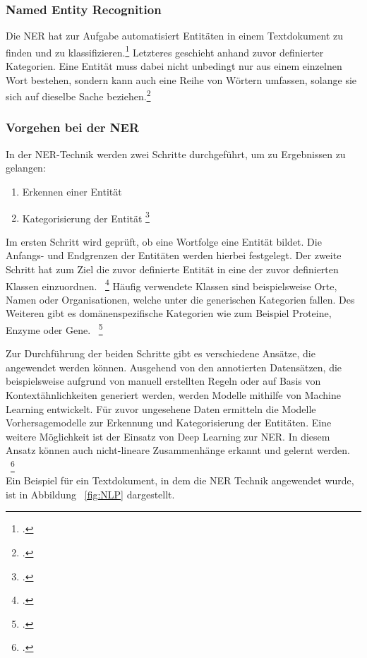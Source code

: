 \subsubsection{Named Entity Recognition}
Die \acl{NER} hat zur Aufgabe automatisiert Entitäten in einem Textdokument zu finden und zu klassifizieren.\footcite[\vglf][]{kulkrni2022} Letzteres geschieht anhand zuvor definierter Kategorien.
Eine Entität muss dabei nicht unbedingt nur aus einem einzelnen Wort bestehen, sondern kann auch eine Reihe von Wörtern umfassen, solange sie sich auf dieselbe Sache beziehen.\footcite[\vglf][]{strobl2022}

\subsubsection{Vorgehen bei der NER}
In der \ac{NER}-Technik werden zwei Schritte durchgeführt, um zu Ergebnissen zu gelangen:

\begin{enumerate}
    \item Erkennen einer Entität
    \item Kategorisierung der Entität \footcite[\vglf][ \& 230]{zong2021}
\end{enumerate}


Im ersten Schritt wird geprüft, ob eine Wortfolge eine Entität bildet. Die Anfangs- und Endgrenzen der Entitäten werden hierbei festgelegt. Der zweite Schritt hat zum Ziel die zuvor definierte Entität in eine der zuvor definierten Klassen einzuordnen. ~\footcite[\vglf][]{bast2016}
Häufig verwendete Klassen sind beispielsweise Orte, Namen oder Organisationen, welche unter die generischen Kategorien fallen. Des Weiteren gibt es domänenspezifische Kategorien wie zum Beispiel Proteine, Enzyme oder Gene. ~\footcite[\vglf][]{li.2018}


Zur Durchführung der beiden Schritte gibt es verschiedene Ansätze, die angewendet werden können. Ausgehend von den annotierten Datensätzen, die beispielsweise aufgrund von manuell erstellten Regeln oder auf Basis von Kontextähnlichkeiten generiert werden, werden Modelle mithilfe von Machine Learning entwickelt.
Für zuvor ungesehene Daten ermitteln die Modelle Vorhersagemodelle zur Erkennung und Kategorisierung der Entitäten. Eine weitere Möglichkeit ist der Einsatz von Deep Learning zur \ac{NER}. In diesem Ansatz können auch nicht-lineare Zusammenhänge erkannt und gelernt werden. ~\footcite[\vglf][]{li.2018}
\\
Ein Beispiel für ein Textdokument, in dem die \ac{NER} Technik angewendet wurde, ist in Abbildung ~\ref{fig:NLP} dargestellt.\\


